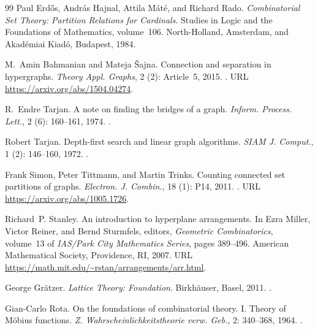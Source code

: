 \documentclass[a4paper,11pt,reqno]{amsart}
\theoremstyle{plain}
\theoremstyle{definition}
\theoremstyle{remark}
\begin{document}
\begin{thebibliography}{99}
Paul Erd{\H{o}}s, Andr{\'a}s Hajnal, Attila M{\'a}t{\'e}, and Richard Rado.
\newblock \emph{Combinatorial Set Theory: Partition Relations for Cardinals}.
\newblock Studies in Logic and the Foundations of Mathematics, volume~106.
  North-Holland, Amsterdam, and Akad{\'e}miai Kiad{\'o}, Budapest, 1984.

M.~Amin Bahmanian and Mateja \v{S}ajna.
\newblock Connection and separation in hypergraphs.
\newblock \emph{Theory Appl. Graphs}, 2 (2): Article~5, 2015.
\newblock {}.
\newblock URL \url{https://arxiv.org/abs/1504.04274}.

R.~Endre Tarjan.
\newblock A note on finding the bridges of a graph.
\newblock \emph{Inform. Process. Lett.}, 2 (6): 160--161, 1974.
\newblock {}.

Robert Tarjan.
\newblock Depth-first search and linear graph algorithms.
\newblock \emph{SIAM J. Comput.}, 1 (2): 146--160, 1972.
\newblock {}.

Frank Simon, Peter Tittmann, and Martin Trinks.
\newblock Counting connected set partitions of graphs.
\newblock \emph{Electron. J. Combin.}, 18 (1): P14, 2011.
\newblock {}.
\newblock URL \url{https://arxiv.org/abs/1005.1726}.

Richard~P. Stanley.
\newblock An introduction to hyperplane arrangements.
\newblock In Ezra Miller, Victor Reiner, and Bernd Sturmfels, editors,
  \emph{Geometric Combinatorics}, volume~13 of \emph{IAS/Park City
  Mathematics Series}, pages 389--496. American Mathematical Society,
  Providence, RI, 2007.
\newblock URL \url{https://math.mit.edu/~rstan/arrangements/arr.html}.

George Gr{\"a}tzer.
\newblock \emph{Lattice Theory: Foundation}.
\newblock Birkh{\"a}user, Basel, 2011.
\newblock {}.

Gian-Carlo Rota.
\newblock On the foundations of combinatorial theory. I. Theory of
  M\"obius functions.
\newblock \emph{Z. Wahrscheinlichkeitstheorie verw. Geb.}, 2:
  340--368, 1964.
\newblock {}.


\end{thebibliography}
\end{document}
